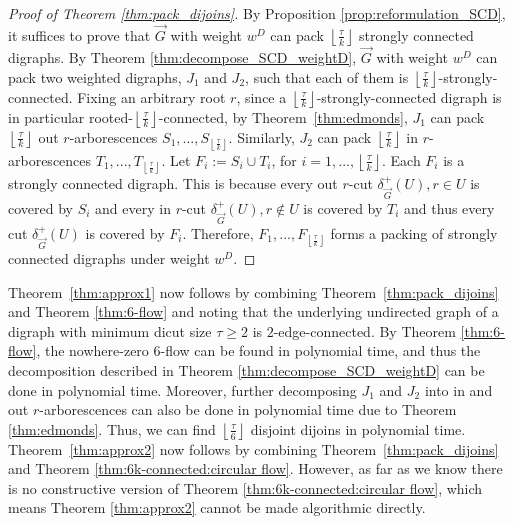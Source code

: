 \documentclass[runningheads]{llncs}
\newcommand{\rounddown}[1]{\left\lfloor#1\right\rfloor}
\begin{document}
\begin{proof}[Proof of Theorem \ref{thm:pack_dijoins}]
    By Proposition \ref{prop:reformulation_SCD}, it suffices to prove that $\vec{G}$ with weight $w^D$ can pack $\rounddown{\frac{\tau}{k}}$ strongly connected digraphs. By Theorem \ref{thm:decompose_SCD_weightD}, $\vec{G}$ with weight $w^D$ can pack two weighted digraphs, $J_1$ and $J_2$, such that each of them is $\rounddown{\frac{\tau}{k}}$-strongly-connected. Fixing an arbitrary root $r$, since a $\rounddown{\frac{\tau}{k}}$-strongly-connected digraph is in particular rooted-$\rounddown{\frac{\tau}{k}}$-connected, by Theorem~\ref{thm:edmonds}, $J_1$ can pack $\rounddown{\frac{\tau}{k}}$ out $r$-arborescences $S_1,...,S_{\rounddown{\frac{\tau}{k}}}$. Similarly, $J_2$ can pack $\rounddown{\frac{\tau}{k}}$ in $r$-arborescences $T_1,...,T_{\rounddown{\frac{\tau}{k}}}$. Let $F_i:=S_i\cup T_i$, for $i=1,...,\rounddown{\frac{\tau}{k}}$. Each $F_i$ is a strongly connected digraph. This is because every out $r$-cut $\delta_{\vec{G}}^+(U), r\in U$ is covered by $S_i$ and every in $r$-cut $\delta_{\vec{G}}^+(U), r\notin U$ is covered by $T_i$ and thus every cut $\delta_{\vec{G}}^+(U)$ is covered by $F_i$. Therefore, $F_1,...,F_{\rounddown{\frac{\tau}{k}}}$ forms a packing of strongly connected digraphs under weight $w^D$.
\end{proof}

Theorem~\ref{thm:approx1} now follows by combining Theorem~\ref{thm:pack_dijoins} and Theorem \ref{thm:6-flow} and noting that the underlying undirected graph of a digraph with minimum dicut size $\tau\geq 2$ is $2$-edge-connected. By Theorem \ref{thm:6-flow}, the nowhere-zero $6$-flow can be found in polynomial time, and thus the decomposition described in Theorem \ref{thm:decompose_SCD_weightD} can be done in polynomial time. Moreover, further decomposing $J_1$ and $J_2$ into in and out $r$-arborescences can also be done in polynomial time due to Theorem \ref{thm:edmonds}. Thus, we can find $\rounddown{\frac{\tau}{6}}$ disjoint dijoins in polynomial time. 
Theorem~\ref{thm:approx2} now follows by combining Theorem~\ref{thm:pack_dijoins} and Theorem \ref{thm:6k-connected:circular flow}. However, as far as we know there is no constructive version of Theorem \ref{thm:6k-connected:circular flow}, which means Theorem \ref{thm:approx2} cannot be made algorithmic directly.
\end{document}
